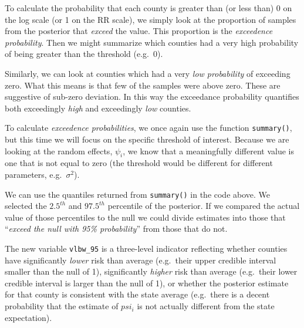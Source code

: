 \documentclass[
]{book}
\newenvironment{Shaded}{\begin{snugshade}}{\end{snugshade}}
\newcommand{\CommentTok}[1]{\textcolor[rgb]{0.56,0.35,0.01}{\textit{#1}}}
\newcommand{\ConstantTok}[1]{\textcolor[rgb]{0.56,0.35,0.01}{#1}}
\newcommand{\DecValTok}[1]{\textcolor[rgb]{0.00,0.00,0.81}{#1}}
\newcommand{\FunctionTok}[1]{\textcolor[rgb]{0.13,0.29,0.53}{\textbf{#1}}}
\newcommand{\NormalTok}[1]{#1}
\newcommand{\OtherTok}[1]{\textcolor[rgb]{0.56,0.35,0.01}{#1}}
\newcommand{\SpecialCharTok}[1]{\textcolor[rgb]{0.81,0.36,0.00}{\textbf{#1}}}
\newcommand{\StringTok}[1]{\textcolor[rgb]{0.31,0.60,0.02}{#1}}
\begin{document}
To calculate the probability that each county is greater than (or less than) 0 on the log scale (or 1 on the RR scale), we simply look at the proportion of samples from the posterior that \emph{exceed} the value. This proportion is the \emph{exceedence probability}. Then we might summarize which counties had a very high probability of being greater than the threshold (e.g.~0).

Similarly, we can look at counties which had a very \emph{low probability} of exceeding zero. What this means is that few of the samples were above zero. These are suggestive of sub-zero deviation. In this way the exceedance probability quantifies both exceedingly \emph{high} and exceedingly \emph{low} counties.

To calculate \emph{exceedence probabilities}, we once again use the function \texttt{summary()}, but this time we will focus on the specific threshold of interest. Because we are looking at the random effects, \(\psi_i\), we know that a meaningfully different value is one that is not equal to zero (the threshold would be different for different parameters, e.g.~\(\sigma^2\)).

We can use the quantiles returned from \texttt{summary()} in the code above. We selected the \(2.5^{th}\) and \(97.5^{th}\) percentile of the posterior. If we compared the actual value of those percentiles to the null we could divide estimates into those that ``\emph{exceed the null with 95\% probability}'' from those that do not.

\begin{Shaded}
\end{Shaded}

The new variable \texttt{vlbw\_95} is a three-level indicator reflecting whether counties have significantly \emph{lower} risk than average (e.g.~their upper credible interval smaller than the null of 1), significantly \emph{higher} risk than average (e.g.~their lower credible interval is larger than the null of 1), or whether the posterior estimate for that county is consistent with the state average (e.g.~there is a decent probability that the estimate of \(psi_i\) is not actually different from the state expectation).
\end{document}

